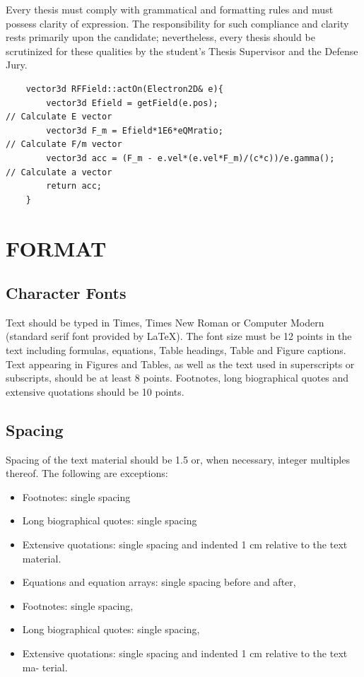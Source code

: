 \documentclass[a4paper,oneside,12pt]{report}
\numberwithin{equation}{chapter}
\begin{document}
Every thesis must comply with grammatical and formatting rules and must possess clarity of expression. The responsibility for such compliance and
clarity rests primarily upon the candidate; nevertheless, every thesis should be scrutinized for these qualities by the student's Thesis Supervisor and the Defense Jury.


\begin{verbatim}
    vector3d RFField::actOn(Electron2D& e){
        vector3d Efield = getField(e.pos);                            // Calculate E vector
        vector3d F_m = Efield*1E6*eQMratio;                           // Calculate F/m vector
        vector3d acc = (F_m - e.vel*(e.vel*F_m)/(c*c))/e.gamma();     // Calculate a vector
        return acc;
    }
\end{verbatim}


\chapter{FORMAT}
\label{chapter:format}

\section{Character Fonts}

Text should be typed in Times, Times New Roman or Computer Modern
(standard serif font provided by \LaTeX). The font size must be 12 points in the text including formulas, equations, Table headings, Table and Figure captions. Text appearing in Figures and Tables, as well as the text used in superscripts or subscripts, should be at least 8 points. Footnotes, long biographical quotes and extensive quotations should be 10 points.


\section{Spacing}

Spacing of the text material should be 1.5 or, when necessary, integer multiples thereof. The following are exceptions:
\begin{itemize}
 \item Footnotes: single spacing
 \item Long biographical quotes: single spacing
 \item Extensive quotations: single spacing and indented 1 cm relative to the text material.
 \item Equations and equation arrays: single spacing before and after,
 \item Footnotes: single spacing,
 \item Long biographical quotes: single spacing,
 \item Extensive quotations: single spacing and indented 1 cm relative to the text ma-
terial.
\end{itemize}
\end{document}

